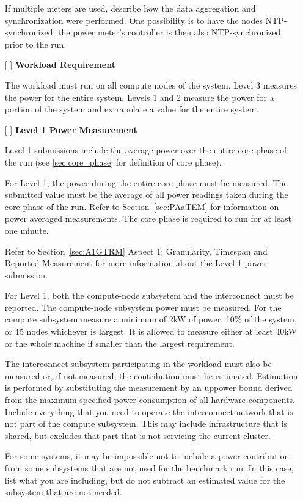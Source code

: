 \begin{itemize}
If multiple meters are used, describe how the data aggregation and synchronization were performed. One possibility is to have the nodes NTP-synchronized; the power meter's controller is then also NTP-synchronized prior to the run.

\item[{[ ]}]
\textbf{Workload Requirement}

The workload must run on all compute nodes of the system. Level 3 measures the power for the entire system. Levels 1 and 2 measure the power for a portion of the system and extrapolate a value for the entire system. 

\item[{[ ]}]
\textbf{Level 1 Power Measurement}

Level 1 submissions include the average power over the entire core phase of the run (see \ref{sec:core_phase} for definition of core phase).

For Level 1, the power during the entire core phase must be measured.
The submitted value must be the average of all power readings taken during the core phase of the run.
Refer to Section~\ref{sec:PAaTEM} for information on power averaged measurements.
The core phase is required to run for at least one minute.

Refer to Section~\ref{sec:A1GTRM} Aspect 1: Granularity, Timespan and Reported Measurement for more information about the Level 1 power submission.

For Level 1, both the compute-node subsystem and the interconnect must be reported.  
The compute-node subsystem power must be measured. 
For the compute subsystem measure a minimum of 2kW of power, 
10\% of the system, or 15 nodes whichever is largest.
It is allowed to measure either at least 40kW or the whole machine if smaller than the largest requirement.

The interconnect subsystem participating in the workload must also be measured or, if not measured, the contribution must be estimated.
Estimation is performed by substituting the measurement by an uppower bound derived from the maximum specified power consumption of all hardware components.
Include everything that you need to operate the interconnect network that is not part of the compute subsystem. 
This may include infrastructure that is shared, but excludes that part that is not servicing the current cluster.

For some systems, it may be impossible not to include a power contribution from some subsystems that are not used for the benchmark run.
In this case, list what you are including, but do not subtract an estimated value for the subsystem that are not needed.


\end{itemize}
